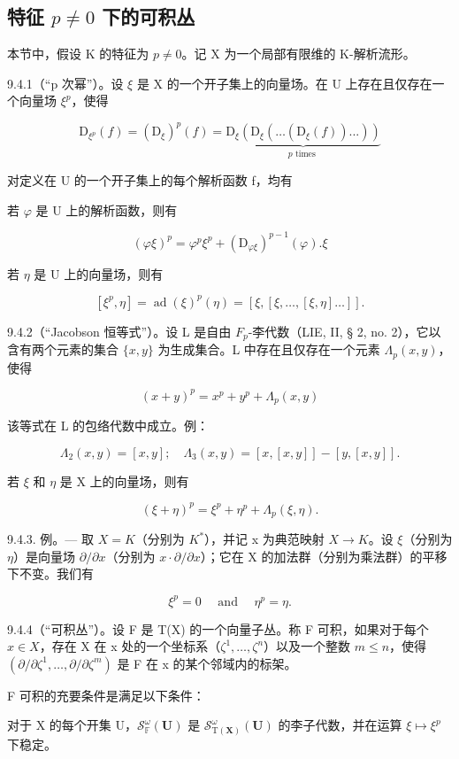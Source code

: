 \subsection{\texorpdfstring{特征 \(p \neq 0\) 下的可积丛}{特征 p 非零时的可积丛}}

本节中，假设 K 的特征为 \(p \neq 0\)。记 X 为一个局部有限维的 K-解析流形。

9.4.1（“p 次幂”）。设 \(\xi\) 是 X 的一个开子集上的向量场。在 U 上存在且仅存在一个向量场 \(\xi^p\)，使得

\[
\mathrm{D} _ {\xi^ {p}} (f) = (\mathrm{D} _ {\xi}) ^ {p} (f) = \underbrace {\mathrm{D} _ {\xi} (\mathrm{D} _ {\xi} (\dots (\mathrm{D} _ {\xi} (f)) . . .))} _ {p \text { times }}\tag{1}
\]

对定义在 U 的一个开子集上的每个解析函数 f，均有

若 \(\varphi\) 是 U 上的解析函数，则有

\[
(\varphi \xi) ^ {p} = \varphi^ {p} \xi^ {p} + (\mathrm{D} _ {\varphi \xi}) ^ {p - 1} (\varphi). \xi\tag{2}
\]

若 \(\eta\) 是 U 上的向量场，则有

\[
[ \xi^ {p}, \eta ] = \operatorname{ad}(\xi) ^ {p} (\eta) = [ \xi , [ \xi , \dots , [ \xi , \eta ] \dots ] ].\tag{3}
\]

9.4.2（“Jacobson 恒等式”）。设 L 是自由 \(F_{p}\)-李代数（LIE, II, § 2, no. 2），它以含有两个元素的集合 \(\{x, y\}\) 为生成集合。L 中存在且仅存在一个元素 \(\Lambda_{p}(x, y)\)，使得

\[
(x + y) ^ {p} = x ^ {p} + y ^ {p} + \Lambda_ {p} (x, y)\tag{4}
\]

该等式在 L 的包络代数中成立。例：

\[
\Lambda_ {2} (x, y) = [ x, y ]; \quad \Lambda_ {3} (x, y) = [ x, [ x, y ] ] - [ y, [ x, y ] ].
\]

若 \(\xi\) 和 \(\eta\) 是 X 上的向量场，则有

\[
(\xi + \eta) ^ {p} = \xi^ {p} + \eta^ {p} + \Lambda_ {p} (\xi , \eta).\tag{5}
\]

9.4.3. 例。--- 取 \(X = K\)（分别为 \(K^*\)），并记 x 为典范映射 \(X \to K\)。设 \(\xi\)（分别为 \(\eta\)）是向量场 \(\partial/\partial x\)（分别为 \(x\cdot\partial/\partial x\)）；它在 X 的加法群（分别为乘法群）的平移下不变。我们有

\[
\xi^ {p} = 0 \quad \text { and } \quad \eta^ {p} = \eta .\tag{6}
\]

9.4.4（“可积丛”）。设 F 是 T(X) 的一个向量子丛。称 F 可积，如果对于每个 \(x \in X\)，存在 X 在 x 处的一个坐标系（\(\zeta^{1}, \ldots, \zeta^{n}\)）以及一个整数 \(m \leqslant n\)，使得 \((\partial/\partial\zeta^{1}, \ldots, \partial/\partial\zeta^{m})\) 是 F 在 x 的某个邻域内的标架。

F 可积的充要条件是满足以下条件：

对于 X 的每个开集 U，\(\mathcal{S}_{\mathbb{F}}^{\omega}(\mathbf{U})\) 是 \(\mathcal{S}_{\mathrm{T}(\mathbf{X})}^{\omega}(\mathbf{U})\) 的李子代数，并在运算 \(\xi \mapsto \xi^{p}\) 下稳定。

